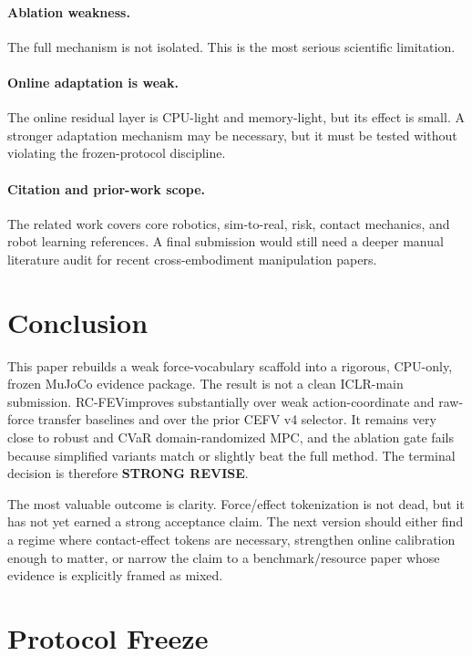 \documentclass{article}
\newcommand{\method}{RC-FEV}
\begin{document}
\paragraph{Ablation weakness.}
The full mechanism is not isolated. This is the most serious scientific limitation.

\paragraph{Online adaptation is weak.}
The online residual layer is CPU-light and memory-light, but its effect is small. A stronger adaptation mechanism may be necessary, but it must be tested without violating the frozen-protocol discipline.

\paragraph{Citation and prior-work scope.}
The related work covers core robotics, sim-to-real, risk, contact mechanics, and robot learning references. A final submission would still need a deeper manual literature audit for recent cross-embodiment manipulation papers.

\section{Conclusion}

This paper rebuilds a weak force-vocabulary scaffold into a rigorous, CPU-only, frozen MuJoCo evidence package. The result is not a clean ICLR-main submission. \method improves substantially over weak action-coordinate and raw-force transfer baselines and over the prior CEFV v4 selector. It remains very close to robust and CVaR domain-randomized MPC, and the ablation gate fails because simplified variants match or slightly beat the full method. The terminal decision is therefore \textbf{STRONG REVISE}.

The most valuable outcome is clarity. Force/effect tokenization is not dead, but it has not yet earned a strong acceptance claim. The next version should either find a regime where contact-effect tokens are necessary, strengthen online calibration enough to matter, or narrow the claim to a benchmark/resource paper whose evidence is explicitly framed as mixed.

\clearpage
\appendix

\section{Protocol Freeze}
\end{document}
